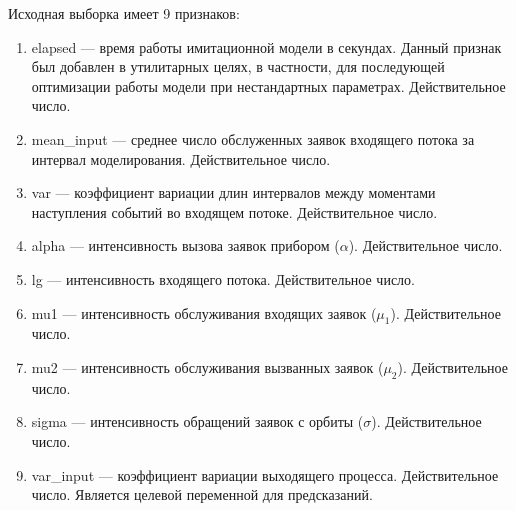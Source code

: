 Исходная выборка имеет 9 признаков:
\begin{enumerate}
	\item elapsed --- время работы имитационной модели в секундах. Данный признак был добавлен в утилитарных целях, в частности, для последующей оптимизации работы модели при нестандартных параметрах. Действительное число.
	\item mean\_input --- среднее число обслуженных заявок входящего потока за интервал моделирования. Действительное число.
	\item var --- коэффициент вариации длин интервалов между моментами наступления событий во входящем потоке. Действительное число.
	\item alpha --- интенсивность вызова заявок прибором ($\alpha$). Действительное число.
	\item lg --- интенсивность входящего потока. Действительное число.
	\item mu1 --- интенсивность обслуживания входящих заявок ($\mu_1$). Действительное число.
	\item mu2 --- интенсивность обслуживания вызванных заявок ($\mu_2$). Действительное число.
	\item sigma --- интенсивность обращений заявок с орбиты ($\sigma$). Действительное число.
	\item var\_input --- коэффициент вариации выходящего процесса. Действительное число. Является целевой переменной для предсказаний.
\end{enumerate}

